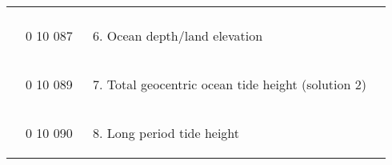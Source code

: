 \begin{longtable}[]{@{}llll@{}}
\begin{minipage}[t]{0.22\columnwidth}
\end{minipage} & \begin{minipage}[t]{0.22\columnwidth}\raggedright
\strut
\end{minipage}\tabularnewline
\begin{minipage}[t]{0.22\columnwidth}\raggedright
\strut
\end{minipage} & \begin{minipage}[t]{0.22\columnwidth}\raggedright
0 10 087\strut
\end{minipage} & \begin{minipage}[t]{0.22\columnwidth}\raggedright
\begin{enumerate}
\setcounter{enumi}{5}
\item
  Ocean depth/land elevation
\end{enumerate}\strut
\end{minipage} & \begin{minipage}[t]{0.22\columnwidth}\raggedright
\strut
\end{minipage}\tabularnewline
\begin{minipage}[t]{0.22\columnwidth}\raggedright
\strut
\end{minipage} & \begin{minipage}[t]{0.22\columnwidth}\raggedright
0 10 089\strut
\end{minipage} & \begin{minipage}[t]{0.22\columnwidth}\raggedright
\begin{enumerate}
\setcounter{enumi}{6}
\item
  Total geocentric ocean tide height (solution 2)
\end{enumerate}\strut
\end{minipage} & \begin{minipage}[t]{0.22\columnwidth}\raggedright
\strut
\end{minipage}\tabularnewline
\begin{minipage}[t]{0.22\columnwidth}\raggedright
\strut
\end{minipage} & \begin{minipage}[t]{0.22\columnwidth}\raggedright
0 10 090\strut
\end{minipage} & \begin{minipage}[t]{0.22\columnwidth}\raggedright
\begin{enumerate}
\setcounter{enumi}{7}
\item
  Long period tide height
\end{enumerate}\strut
\end{minipage} & \begin{minipage}[t]{0.22\columnwidth}\raggedright

\end{minipage}
\end{longtable}
